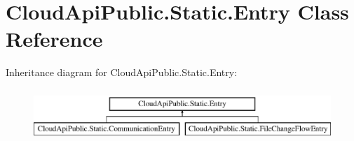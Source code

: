 \hypertarget{class_cloud_api_public_1_1_static_1_1_entry}{\section{Cloud\-Api\-Public.\-Static.\-Entry Class Reference}
\label{class_cloud_api_public_1_1_static_1_1_entry}
}


 


Inheritance diagram for Cloud\-Api\-Public.\-Static.\-Entry\-:\begin{figure}[H]
\begin{center}
\leavevmode
\includegraphics[height=2.000000cm]{class_cloud_api_public_1_1_static_1_1_entry}
\end{center}
\end{figure}
